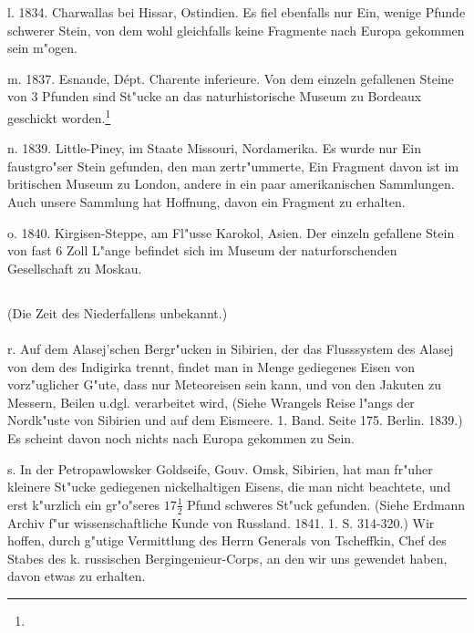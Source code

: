 \documentclass[a4paper, 11pt, oneside, polutonikogreek, german]{article}
\begin{document}
l. 1834. Charwallas bei Hissar, Ostindien. Es fiel ebenfalls nur Ein, wenige Pfunde schwerer Stein, von dem wohl gleichfalls keine Fragmente nach Europa gekommen sein m"ogen.

m. 1837. Esnaude, Dépt. Charente inferieure. Von dem einzeln gefallenen Steine von 3 Pfunden sind St"ucke an das naturhistorische Museum zu Bordeaux geschickt worden.\footnote{}

n. 1839. Little-Piney, im Staate Missouri, Nordamerika. Es wurde nur Ein faustgro"ser Stein gefunden, den man zertr"ummerte, Ein Fragment davon ist im britischen Museum zu London, andere in ein paar amerikanischen Sammlungen. Auch unsere Sammlung hat Hoffnung, davon ein Fragment zu erhalten.

o. 1840. Kirgisen-Steppe, am Fl"usse Karokol, Asien. Der einzeln gefallene Stein von fast 6 Zoll L"ange befindet sich im Museum der naturforschenden Gesellschaft zu Moskau.
\subsection{}
\begin{center}
(Die Zeit des Niederfallens unbekannt.)
\end{center}
\paragraph{}
r. Auf dem Alasej'schen Bergr"ucken in Sibirien, der das Flusssystem des Alasej von dem des Indigirka trennt, findet man in Menge gediegenes Eisen von vorz"uglicher G"ute, dass nur Meteoreisen sein kann, und von den Jakuten zu Messern, Beilen u.dgl. verarbeitet wird, (Siehe Wrangels Reise l"angs der Nordk"uste von Sibirien und auf dem Eismeere. 1. Band. Seite 175. Berlin. 1839.) Es scheint davon noch nichts nach Europa gekommen zu Sein.

s. In der Petropawlowsker Goldseife, Gouv. Omsk, Sibirien, hat man fr"uher kleinere St"ucke gediegenen nickelhaltigen Eisens, die man nicht beachtete, und erst k"urzlich ein gr"o"seres $\mathfrak{17\frac{1}{2}}$ Pfund schweres St"uck gefunden. (Siehe Erdmann Archiv f"ur wissenschaftliche Kunde von Russland. 1841. 1. S. 314-320.) Wir hoffen, durch g"utige Vermittlung des Herrn Generals von Tscheffkin, Chef des Stabes des k. russischen Bergingenieur-Corps, an den wir uns gewendet haben, davon etwas zu erhalten.
\end{document}
